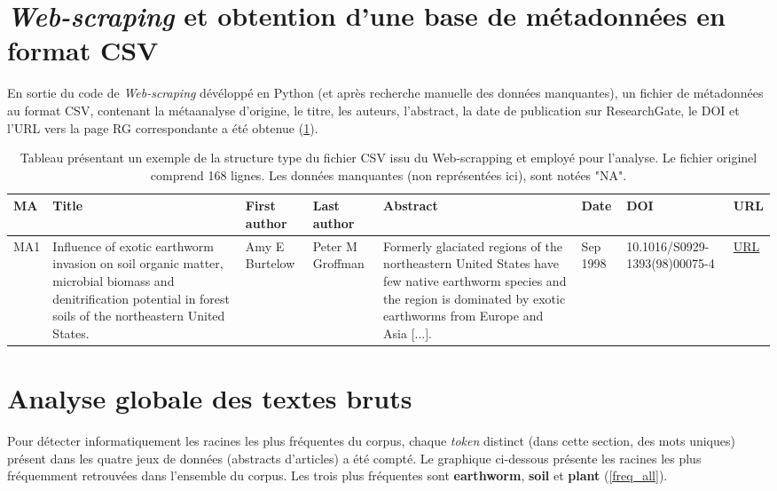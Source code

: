 \documentclass{book}
\begin{document}
\section{\textit{Web-scraping} et obtention d'une base de métadonnées en format CSV}
\noindent
En sortie du code de \textit{Web-scraping} dévéloppé en Python (et après recherche manuelle des données manquantes), un fichier de métadonnées au format CSV, contenant la métaanalyse d'origine, le titre, les auteurs, l'abstract, la date de publication sur ResearchGate, le DOI et l'URL vers la page RG correspondante a été obtenue (\cref{Table 1}). 
\begin{table}[H]
    \begin{tabular}{|p{0.7cm}|p{2cm}|p{1.5cm}|p{1.5cm}|p{3cm}|p{1.4cm}|p{2.1cm}|p{1cm}|}
      \hline
      \textbf{MA} & \textbf{Title} & \textbf{First author} & \textbf{Last author} & \textbf{Abstract} & \textbf{Date} & \textbf{DOI} & \textbf{URL} 
       \\
       \hline
      MA1 &
      Influence of exotic earthworm invasion on soil organic matter, microbial biomass and denitrification potential in forest soils of the northeastern United States. &
      Amy E Burtelow &
      Peter M Groffman &
      Formerly glaciated regions of the northeastern United States have few native earthworm species and the region is dominated by exotic earthworms from Europe and Asia [...]. &
      Sep 1998 &
      10.1016/S0929-1393(98)00075-4 &
      \href{https://www.researchgate.net/publication/222504320_Influence_of_exotic_earthworm_invasion_on_soil_organic_matter_microbial_biomass_and_denitrification_potential_in_forest_soils_of_the_northeastern_United_States?\_sg=Yv_a-THpFLD4vDUrl0rXvw4YNA6TBSRqNj_obWyLYzEIp3c_WKtxs7crdoVE05VQwdF5S5LHlSvHMqs}{URL}
       \\
       \hline
    \end{tabular}
    \caption[Table 1]{Tableau présentant un exemple de la structure type du fichier CSV issu du Web-scrapping et employé pour l'analyse. Le fichier originel comprend 168 lignes. Les données manquantes (non représentées ici), sont notées "NA".\label{Table 1}}
    \end{table}

\newpage
\section{Analyse globale des textes bruts}
\noindent
Pour détecter informatiquement les racines les plus fréquentes du corpus, chaque \textit{token} distinct (dans cette section, des mots uniques) présent dans les quatre jeux de données (abstracts d'articles) a été compté.  Le graphique ci-dessous présente les racines les plus fréquemment retrouvées dans l'ensemble du corpus. Les trois plus fréquentes sont \textbf{earthworm}, \textbf{soil} et \textbf{plant} (\cref{freq_all}).
\end{document}
